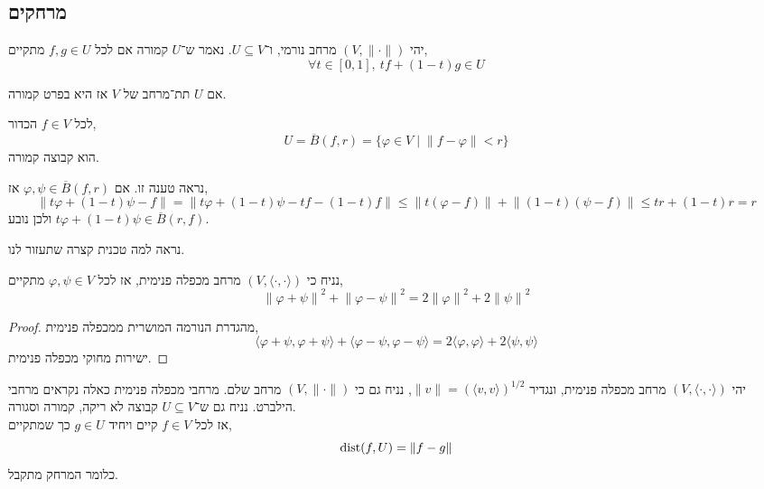 \subsection{מרחקים}
\begin{definition}
	יהי $(V, \lVert \cdot \rVert)$ מרחב נורמי, ו־$U \subseteq V$.
	נאמר ש־$U$ קמורה אם לכל $f, g \in U$ מתקיים,
	\[
		\forall t \in [0, 1],\ t f + (1 - t) g \in U
	\]
\end{definition}
\begin{example}
	אם $U$ תת־מרחב של $V$ אז היא בפרט קמורה.
\end{example}
\begin{example}
	לכל $f \in V$ הכדור,
	\[
		U
		= \overline{B}(f, r)
		= \{ \varphi \in V \mid \lVert f - \varphi \rVert < r \}
	\]
	הוא קבוצה קמורה.

	נראה טענה זו.
	אם $\varphi, \psi \in \overline{B}(f, r)$ אז,
	\[
		\lVert t \varphi + (1 - t) \psi - f \rVert
		= \lVert t \varphi + (1 - t) \psi - t f - (1 - t) f \rVert
		\le \lVert t (\varphi - f) \rVert + \lVert (1 - t) (\psi - f) \rVert
		\le tr + (1 - t) r
		= r
	\]
	ולכן נובע $t \varphi + (1 - t) \psi \in \overline{B}(r, f)$.
\end{example}
נראה למה טכנית קצרה שתעזור לנו.
\begin{lemma}
	נניח כי $(V, \langle \cdot, \cdot \rangle)$ מרחב מכפלה פנימית, אז לכל $\varphi, \psi \in V$ מתקיים,
	\[
		{\lVert \varphi + \psi \rVert}^2 + {\lVert \varphi - \psi \rVert}^2
		= 2 {\lVert \varphi \rVert}^2 + 2 {\lVert \psi \rVert}^2
	\]
\end{lemma}
\begin{proof}
	מהגדרת הנורמה המושרית ממכפלה פנימית,
	\[
		\langle \varphi + \psi, \varphi + \psi \rangle + \langle \varphi - \psi, \varphi - \psi \rangle
		= 2 \langle \varphi, \varphi \rangle + 2 \langle \psi, \psi \rangle
	\]
	ישירות מחוקי מכפלה פנימית.
\end{proof}
\begin{theorem}
	יהי $(V, \langle \cdot, \cdot \rangle)$ מרחב מכפלה פנימית, ונגדיר $\lVert v \rVert = {(\langle v, v \rangle)}^{1 / 2}$, נניח גם כי $(V, \lVert \cdot \rVert)$ מרחב שלם.
	מרחבי מכפלה פנימית כאלה נקראים מרחבי הילברט.
	נניח גם ש־$U \subseteq V$ קבוצה לא ריקה, קמורה וסגורה. \\
	אז לכל $f \in V$ קיים ויחיד $g \in U$ כך שמתקיים,
	\[
		\operatorname{dist}(f, U)
		= \lVert f - g \rVert
	\]
	כלומר המרחק מתקבל.
\end{theorem}
